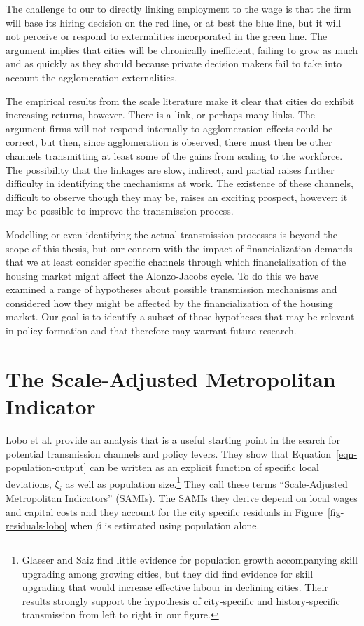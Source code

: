 The challenge to our   to directly linking employment to the wage is that the firm will base its hiring decision on the red line, or at best the blue line, but it will not perceive or  respond to externalities incorporated in the green line.  The argument implies  that cities will be chronically inefficient, failing to grow as  much and as quickly as they should because private decision makers fail to take into account the agglomeration externalities. 

The empirical results from the scale literature  make it clear that cities do exhibit increasing returns, however. There is a link, or perhaps many links. The argument firms will not respond internally to agglomeration effects could be correct, but then, since agglomeration is observed, there must then  be other channels  transmitting at least some of the gains from scaling to the workforce. The possibility that the linkages are slow, indirect, and partial raises further difficulty in identifying the mechanisms at work.  The existence of these channels, difficult to observe though they may be, raises an exciting prospect, however: it may be possible to improve the  transmission process. 


Modelling or even identifying  the actual transmission processes is beyond the scope of this thesis, but our concern with the impact of financialization demands that we at least consider specific channels through which financialization of the housing market might affect the Alonzo-Jacobs cycle. To do this we have examined a range of hypotheses about possible transmission mechanisms and considered how they might be affected by the financialization of the housing market. Our goal is to identify a subset of those hypotheses that may be relevant in policy formation and that therefore may warrant future research.



\section{The Scale-Adjusted Metropolitan Indicator}

 Lobo et al. \cite{loboUrbanScalingProduction2013} provide an  analysis that is a useful starting point in the search for potential transmission channels and policy levers. They show that Equation~\ref{eqn-population-output} can be written as an explicit  function of specific local deviations, $\xi_i$ 
 as well as population size.\footnote{
Glaeser and Saiz \cite{glaeserRiseSkilledCity2003} find little evidence for population growth accompanying skill upgrading among growing cities,  but they did find  evidence for skill upgrading that would increase effective labour in declining cities. Their results strongly  support the hypothesis of city-specific  and history-specific transmission from left to right in our figure.}  
They  call these terms ``Scale-Adjusted Metropolitan Indicators'' (SAMIs). The SAMIs they derive depend on local wages and capital costs and they account for the city specific residuals in Figure~\ref{fig-residuals-lobo} when $\beta$ is estimated using population alone. 
 

